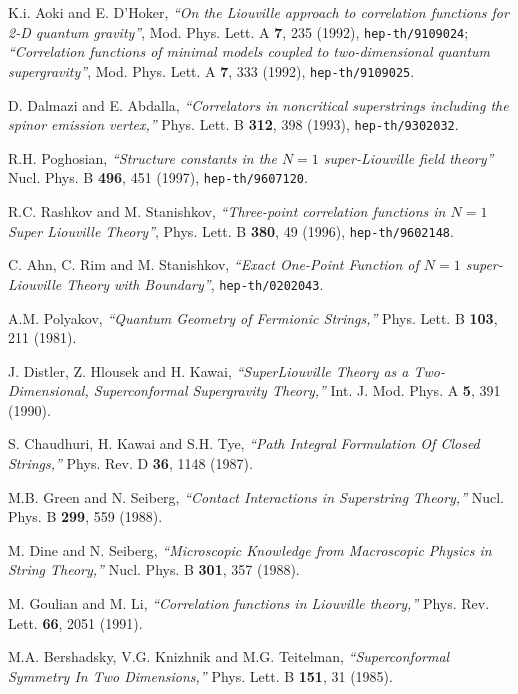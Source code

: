 \documentclass[a4paper,12pt]{article}
\begin{document}
 K.i. Aoki and E. D'Hoker,
    {\sl ``On the Liouville approach to correlation functions
           for 2-D quantum gravity''},
    Mod. Phys. Lett. A {\bf 7}, 235 (1992),
    {\tt hep-th/9109024};
    {\sl ``Correlation functions of minimal models coupled to
           two-dimensional quantum supergravity''},
    Mod. Phys. Lett. A {\bf 7}, 333 (1992),
    {\tt hep-th/9109025}.

 D. Dalmazi and E. Abdalla,
    {\sl ``Correlators in noncritical superstrings including
           the spinor emission vertex,''}
    Phys. Lett. B {\bf 312}, 398 (1993),
    {\tt hep-th/9302032}.

 R.H. Poghosian,
    {\sl ``Structure constants in the $N=1$ super-Liouville field theory''}
    Nucl. Phys. B {\bf 496}, 451 (1997),
    {\tt hep-th/9607120}.

 R.C. Rashkov and M. Stanishkov,
    {\sl ``Three-point correlation functions
           in $N=1$ Super Liouville Theory''},
    Phys. Lett. B {\bf 380}, 49 (1996),
    {\tt hep-th/9602148}.

 C. Ahn, C. Rim and M. Stanishkov,
    {\sl ``Exact One-Point Function of $N=1$ super-Liouville
           Theory with Boundary''},
    {\tt hep-th/0202043}.

 A.M. Polyakov,
    {\sl ``Quantum Geometry of Fermionic Strings,''}
    Phys. Lett. B {\bf 103}, 211 (1981).

 J. Distler, Z. Hlousek and H. Kawai,
    {\sl ``SuperLiouville Theory as a Two-Dimensional, Superconformal
           Supergravity Theory,''}
    Int. J. Mod. Phys. A {\bf 5}, 391 (1990).

 S. Chaudhuri, H. Kawai and S.H. Tye,
    {\sl ``Path Integral Formulation Of Closed Strings,''}
    Phys. Rev. D {\bf 36}, 1148 (1987).

 M.B. Green and N. Seiberg,
    {\sl ``Contact Interactions in Superstring Theory,''}
    Nucl. Phys. B {\bf 299}, 559 (1988).

 M. Dine and N. Seiberg,
    {\sl ``Microscopic Knowledge from Macroscopic Physics in String Theory,''}
    Nucl. Phys. B {\bf 301}, 357 (1988).

 M. Goulian and M. Li,
    {\sl ``Correlation functions in Liouville theory,''}
    Phys. Rev. Lett. {\bf 66}, 2051 (1991).

 M.A. Bershadsky, V.G. Knizhnik and M.G. Teitelman,
    {\sl ``Superconformal Symmetry In Two Dimensions,''}
    Phys. Lett. B {\bf 151}, 31 (1985).
\end{document}
